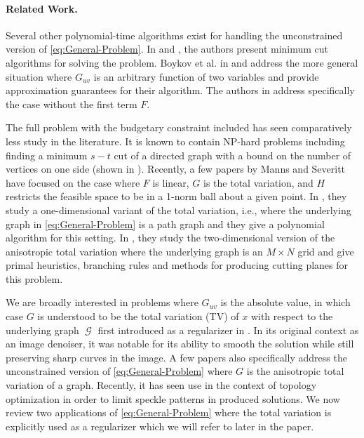 \documentclass[pdflatex,sn-mathphys-num]{sn-jnl}%
\DeclareMathOperator{\Gcal}{\mathcal{G}}
\begin{document}
\paragraph{Related Work.}
Several other polynomial-time algorithms exist for handling the unconstrained version of \eqref{eq:General-Problem}. 
In \cite{ahuja2004cut} and \cite{hochbaum2001efficient}, the authors present  minimum cut algorithms for solving the problem.  Boykov et al. in \cite{boykov2002fast} and \cite{boykov2004experimental} address the more general situation where $G_{uv}$ is an arbitrary function of two variables and provide approximation guarantees for their algorithm. The authors in \cite{bioucas2007phase} address specifically the case without the first term $F$. 

The full problem with the budgetary constraint included has seen comparatively less study in the literature. It is known to contain NP-hard problems including finding a minimum $s-t$ cut of a directed graph with a bound on the number of vertices on one side (shown in \cite{armon2006multicriteria}). Recently, a few papers by Manns and Severitt have focused  on the case where $F$ is linear, $G$ is the total variation, and $H$ restricts the feasible space to be in a 1-norm ball about a given point. In \cite{severitt2023efficient}, they study a one-dimensional variant of the total variation, i.e., where the underlying graph in \eqref{eq:General-Problem} is a path graph and they give a polynomial algorithm for this setting. In \cite{manns2024discrete}, they study the two-dimensional version of the anisotropic total variation where the underlying graph is an $M\times N$ grid and give primal heuristics, branching rules and methods for producing cutting planes for this problem.

We are broadly interested in problems where $G_{uv}$ is the absolute value, in which case $G$ is understood to be the total variation (TV) of $x$ with respect to the underlying graph $\Gcal$ first introduced as a regularizer in \cite{rudin1992nonlinear}. In its original context as an image denoiser, it was notable  for its ability to smooth the solution while still preserving sharp curves in the image. A few papers \cite{zalesky2002network,chambolle2005total} also specifically address the unconstrained version of \eqref{eq:General-Problem} where $G$ is the anisotropic total variation of a graph. Recently, it has seen use in the context of topology optimization \cite{manns2024discrete,severitt2023efficient} in order to limit speckle patterns in produced solutions. We now review two applications of \eqref{eq:General-Problem} where the total variation is explicitly used as a regularizer which we will refer to later in the paper.
\end{document}
